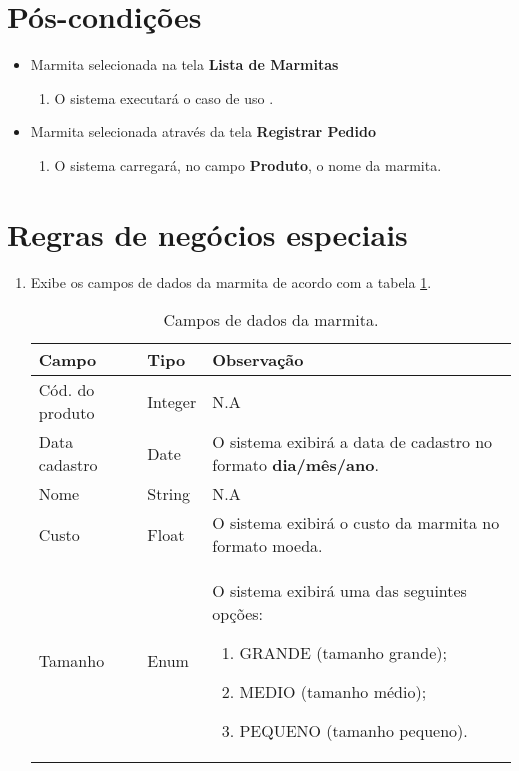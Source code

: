 \section{Pós-condições}

\begin{itemize}
	\item Marmita selecionada na tela \textbf{Lista de Marmitas}
	\begin{enumerate}
		\item O sistema executará o caso de uso .	
	\end{enumerate}

	\item Marmita selecionada através da tela \textbf{Registrar Pedido}
	\begin{enumerate}
		\item O sistema carregará, no campo \textbf{Produto}, o nome da marmita. 
	\end{enumerate}
\end{itemize}

\section{Regras de negócios especiais}

\begin{enumerate}[label=ED\arabic*]
	\item Exibe os campos de dados da marmita de acordo com a tabela \ref{uc012_tb_rn1}. \label{uc012_rn:1}
	\begin{table}[htb]
		\ABNTEXfontereduzida
		\caption[Campos de dados da marmita]{Campos de dados da marmita.}
		\label{uc012_tb_rn1}
		\begin{tabular}{|p{4.0cm}|p{3.0cm}|p{7.25cm}|}
			\hline
			\textbf{Campo}  & \textbf{Tipo} & \textbf{Observação}                                                   \\ \hline
			Cód. do produto & Integer       & N.A                                                                   \\ \hline
			Data cadastro   & Date          & O sistema exibirá a data de cadastro no formato \textbf{dia/mês/ano}. \\ \hline
			Nome            & String        & N.A                                                                   \\ \hline			
			Custo           & Float         & O sistema exibirá o custo da marmita no formato moeda.                \\ \hline
			Tamanho           & Enum          & O sistema exibirá uma das seguintes opções: 	
			\begin{enumerate}
				\item GRANDE (tamanho grande);
				\item MEDIO (tamanho médio);
				\item PEQUENO (tamanho pequeno).
			\end{enumerate}\\ \hline
		\end{tabular}
	\end{table}
\end{enumerate}